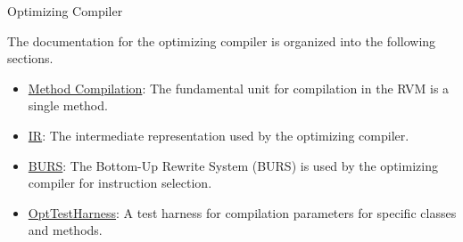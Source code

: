 \begin{section}{Optimizing Compiler}
\label{sec:optimizingcompiler}

The documentation for the optimizing compiler is organized into the following sections.

\begin{itemize}
  \item \hyperref[sec:methodcompilation]{Method Compilation}: The fundamental unit for compilation in the RVM is a single method.
  \item \hyperref[sec:ir]{IR}: The intermediate representation used by the optimizing compiler.
  \item \hyperref[sec:burs]{BURS}: The Bottom-Up Rewrite System (BURS) is used by the optimizing compiler for instruction selection.
  \item \hyperref[sec:opttestharness]{OptTestHarness}: A test harness for compilation parameters for specific classes and methods.
\end{itemize}

\end{section}
